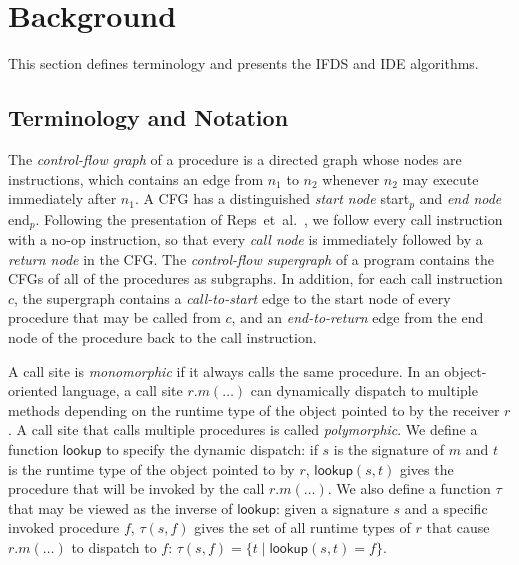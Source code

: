 \section{Background}\label{sec:bg}
This section defines terminology and presents the IFDS and IDE algorithms.

\subsection{Terminology and Notation}
The \textit{control-flow graph} of a procedure is a directed graph whose nodes are instructions, which contains an edge from $n_1$ to $n_2$ whenever
$n_2$ may execute immediately after $n_1$. A CFG has a distinguished \textit{start node} \textsf{start}$_p$ and \textit{end node} \textsf{end}$_p$.
Following the presentation of Reps~et~al.~\cite{reps1995precise,sagiv1996precise}, we follow every
call instruction with a no-op instruction, so that every \textit{call node} is immediately
followed by a \textit{return node} in the CFG.
The \textit{control-flow supergraph} of a program contains the CFGs of all of the procedures as
subgraphs. In addition, for each call instruction $c$, the supergraph contains a \textit{call-to-start} edge to the start node of every procedure that
may be called from $c$, and an \textit{end-to-return} edge from the end node of the procedure back to the call instruction.

A call site is \textit{monomorphic} if it always calls the same procedure. In an object-oriented language, 
a call site $r.m(\ldots)$ can dynamically dispatch to multiple methods depending on the runtime
type of the object pointed to by the receiver $r$.
A call site that calls multiple procedures is called
\textit{polymorphic}.
We define a function $\textsf{lookup}$ to specify the dynamic dispatch: 
if $s$ is the signature of $m$ and $t$ is the runtime type of the object
pointed to by $r$, $\textsf{lookup}(s,t)$ gives the procedure that will
be invoked by the call $r.m(\ldots)$. We also define a function $\tau$
that may be viewed as the inverse
of $\textsf{lookup}$: given a signature $s$ and a specific invoked procedure
$f$, $\tau(s,f)$ gives the set of all runtime types of $r$ that cause $r.m(\ldots)$
to dispatch to $f$: $\tau(s,f) = \{t\mid \textsf{lookup}(s,t)=f\}$.

